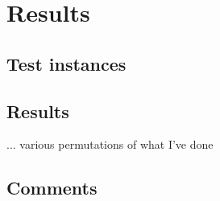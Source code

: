 
\chapter{Results}

\section{Test instances}



\section{Results}
 
... various permutations of what I've done

\section{Comments}
